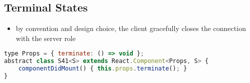 \subsection{Terminal States}
\begin{itemize}
\item by convention and design choice, the client gracefully closes the connection with the server role
\end{itemize}

\begin{lstlisting}[language=javascript,tabsize=2]
type Props = { terminate: () => void };
abstract class S41<S> extends React.Component<Props, S> {
	componentDidMount() { this.props.terminate(); }	
}
\end{lstlisting}